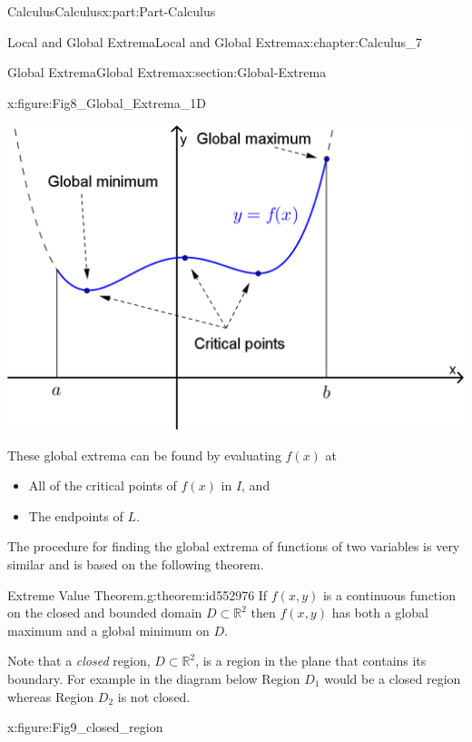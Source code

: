 \documentclass[oneside,10pt,]{book}
\numberwithin{equation}{section}
\begin{document}
\begin{partptx}{Calculus}{}{Calculus}{}{}{x:part:Part-Calculus}
\begin{chapterptx}{Local and Global Extrema}{}{Local and Global Extrema}{}{}{x:chapter:Calculus_7}
\begin{sectionptx}{Global Extrema}{}{Global Extrema}{}{}{x:section:Global-Extrema}
\begin{figureptx}{}{x:figure:Fig8_Global_Extrema_1D}{}
\begin{image}{0.1}{0.8}{0.1}
\includegraphics[width=\linewidth]{./Calculus/Images/7/Fig8_Global_Extrema_1D.png}
\end{image}%
\tcblower
\end{figureptx}%
These global extrema can be found by evaluating \(f(x)\) at%
\par
%
\begin{itemize}[label=\textbullet]
\item{}All of the critical points of \(f(x)\) in \(I\), and%
\item{}The endpoints of \(L\).%
\end{itemize}
%
\par
The procedure for finding the global extrema of functions of two variables is very similar and is based on the following theorem.%
\begin{theorem}{Extreme Value Theorem.}{}{g:theorem:id552976}%
If \(f(x,y)\) is a continuous function on the closed and bounded domain \(D \subset \mathbb{R}^2\) then \(f(x,y)\) has both a global maximum and a global minimum on \(D\).%
\end{theorem}
Note that a \emph{closed} region, \(D \subset \mathbb{R}^2\), is a region in the plane that contains its boundary. For example in the diagram below Region \(D_1\) would be a closed region whereas Region \(D_2\) is not closed.%
\begin{figureptx}{}{x:figure:Fig9_closed_region}{}%
\begin{image}{0.275}{0.45}{0.275}%

\end{image}
\end{figureptx}
\end{sectionptx}
\end{chapterptx}
\end{partptx}
\end{document}
